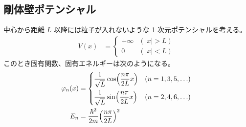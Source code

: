 \documentclass[uplatex,dvipdfmx,a4paper,11pt]{jlreq}
\theoremstyle{definition}
\begin{document}
\subsection{剛体壁ポテンシャル}
\begin{proposition}
  中心から距離 $L$ 以降には粒子が入れないような 1 次元ポテンシャルを考える。
  \begin{align}
    V(x) & = \begin{cases}
               + \infty & (|x| > L) \\
               0        & (|x| < L)
             \end{cases}
  \end{align}
  このとき固有関数、固有エネルギーは次のようになる。
  \begin{align}
    \varphi_n(x) & = \begin{dcases}
                       \frac{1}{\sqrt{L}}\cos(\frac{n\pi}{2L}x) & (n = 1,3,5,\ldots) \\
                       \frac{1}{\sqrt{L}}\sin(\frac{n\pi}{2L}x) & (n = 2,4,6,\ldots)
                     \end{dcases} \\
    E_n          & = \frac{\hbar^2}{2m}\qty(\frac{n\pi}{2L})^2
  \end{align}
\end{proposition}
\end{document}
